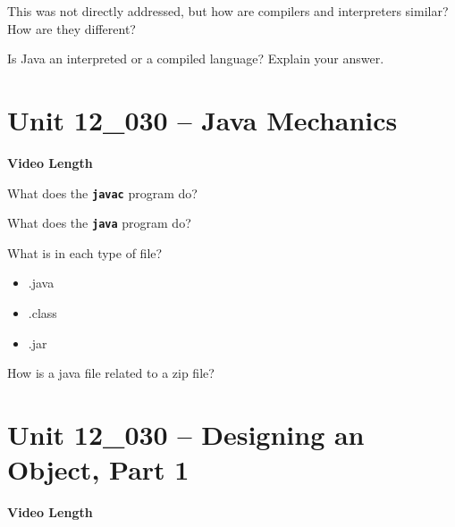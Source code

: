 \documentclass[letterpaper,12pt]{exam}
\newcommand{\unit}{Unit 12}
\begin{document}
\begin{questions}
\begin{samepage}
    \question This was not directly addressed, but how are compilers and interpreters similar?  How are they different?
    \vspace{15mm}
\end{samepage}

\begin{samepage}
    \question Is Java an interpreted or a compiled language?  Explain your answer.
    \vspace{15mm}
\end{samepage}


\section*{\unit\_030 -- Java Mechanics} 
\par{\selectfont\textbf{Video Length }}

\begin{samepage}
    \question What does the \texttt{\textbf{javac}} program do?
    \vspace{5mm}
\end{samepage}

\begin{samepage}
    \question What does the \texttt{\textbf{java}} program do?
    \vspace{5mm}
\end{samepage}
\begin{samepage}
    \question What is in each type of file?
      \begin{itemize}
        \item .java
        \vspace{5mm}
        \item .class
        \vspace{5mm}
        \item .jar
        \vspace{5mm}
       \end{itemize}
\end{samepage}

\begin{samepage}
    \question How is a java file related to a zip file?
    \vspace{5mm}
\end{samepage}

\section*{\unit\_030 -- Designing an Object, Part 1} 
\par{\selectfont\textbf{Video Length }}


\end{questions}
\end{document}
